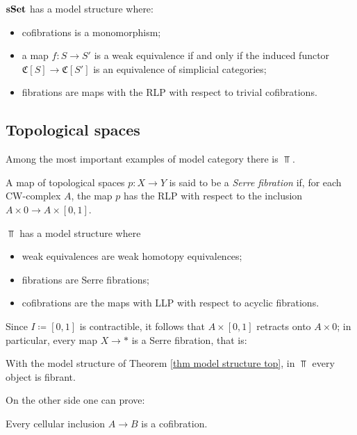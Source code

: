 \begin{refsection}
\begin{thm} \label{thm joyal model structure}
$\mathbf{s\,\!\mathbf{Set}}$ has a model structure where:
\begin{itemize}
\item cofibrations is a monomorphism;
\item a map $f \colon S \to S'$ is a weak equivalence if and only if the induced functor $\mathfrak C[S] \to \mathfrak C[S']$ is an equivalence of simplicial categories;
\item fibrations are maps with the RLP with respect to trivial cofibrations.
\end{itemize}
\end{thm}

\subsection{Topological spaces}

Among the most important examples of model category there is $\Top$.

\begin{defin}
A map of topological spaces $p \colon X \to Y$ is said to be a \emph{Serre fibration} if, for each CW-complex $A$, the map $p$ has the RLP with respect to the inclusion $A \times 0 \to A \times [0,1]$.
\end{defin}

\begin{thm} \label{thm model structure top}
$\Top$ has a model structure where
\begin{itemize}
\item weak equivalences are weak homotopy equivalences;
\item fibrations are Serre fibrations;
\item cofibrations are the maps with LLP with respect to acyclic fibrations.
\end{itemize}
\end{thm}

Since $I\coloneqq [0,1]$ is contractible, it follows that $A \times [0,1]$ retracts onto $A \times 0$; in particular, every map $X \to *$ is a Serre fibration, that is:

\begin{cor}
With the model structure of Theorem \ref{thm model structure top}, in $\Top$ every object is fibrant.
\end{cor}

On the other side one can prove:

\begin{lemma}
Every cellular inclusion $A \to B$ is a cofibration.
\end{lemma}


\end{refsection}
